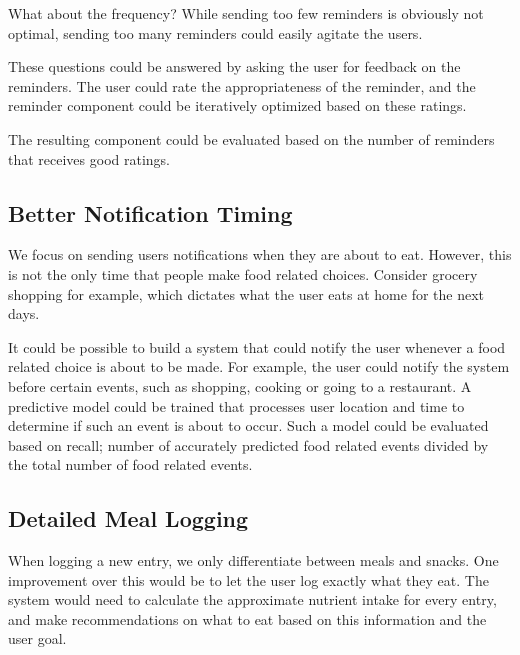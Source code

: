 What about the frequency?
While sending too few reminders is obviously not optimal, 
sending too many reminders could easily agitate the users.

These questions could be answered by asking the user for feedback on the reminders.
The user could rate the appropriateness of the reminder,
and the reminder component could be iteratively optimized based on these ratings.

The resulting component could be evaluated based on the number of reminders that receives good ratings.

\subsection{Better Notification Timing}
We focus on sending users notifications when they are about to eat.
However, this is not the only time that people make food related choices.
Consider grocery shopping for example, which dictates what the user eats at home for the next days.

It could be possible to build a system that could notify the user whenever a food related choice is about to be made.
For example, the user could notify the system before certain events, such as shopping, cooking or going to a restaurant.
A predictive model could be trained that processes user location and time to determine if such an event is about to occur. 
Such a model could be evaluated based on recall; number of accurately predicted food related events divided by the total number of food related events.

\subsection{Detailed Meal Logging}
When logging a new entry, we only differentiate between meals and snacks.
One improvement over this would be to let the user log exactly what they eat.
The system would need to calculate the approximate nutrient intake for every entry,
and make recommendations on what to eat based on this information and the user goal.

